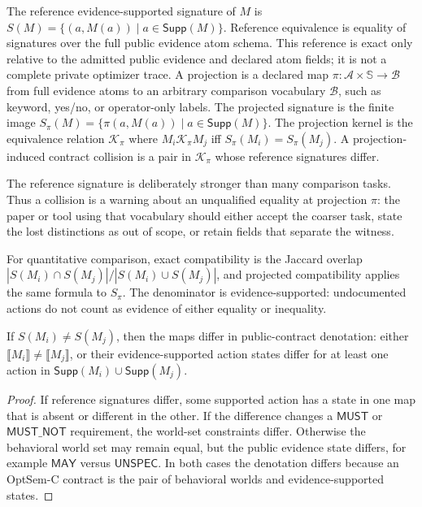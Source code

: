 \begin{definition}
The reference evidence-supported signature of $M$ is $S(M)=\{(a,M(a))\mid a\in\mathsf{Supp}(M)\}$.  Reference equivalence is equality of signatures over the full public evidence atom schema.  This reference is exact only relative to the admitted public evidence and declared atom fields; it is not a complete private optimizer trace.  A projection is a declared map $\pi:\mathcal{A}\times\mathbb{S}\rightarrow\mathcal{B}$ from full evidence atoms to an arbitrary comparison vocabulary $\mathcal{B}$, such as keyword, yes/no, or operator-only labels.  The projected signature is the finite image $S_\pi(M)=\{\pi(a,M(a))\mid a\in\mathsf{Supp}(M)\}$.  The projection kernel is the equivalence relation $\mathcal{K}_\pi$ where $M_i\mathcal{K}_\pi M_j$ iff $S_\pi(M_i)=S_\pi(M_j)$.  A projection-induced contract collision is a pair in $\mathcal{K}_\pi$ whose reference signatures differ.
\end{definition}

The reference signature is deliberately stronger than many comparison tasks.  Thus a collision is a warning about an unqualified equality at projection $\pi$: the paper or tool using that vocabulary should either accept the coarser task, state the lost distinctions as out of scope, or retain fields that separate the witness.

For quantitative comparison, exact compatibility is the Jaccard overlap $|S(M_i)\cap S(M_j)|/|S(M_i)\cup S(M_j)|$, and projected compatibility applies the same formula to $S_\pi$.  The denominator is evidence-supported: undocumented actions do not count as evidence of either equality or inequality.

\begin{lemma}
\label{thm:public-contract-separation}
If $S(M_i)\ne S(M_j)$, then the maps differ in public-contract denotation: either $\llbracket M_i\rrbracket\ne\llbracket M_j\rrbracket$, or their evidence-supported action states differ for at least one action in $\mathsf{Supp}(M_i)\cup\mathsf{Supp}(M_j)$.
\end{lemma}
\begin{proof}
If reference signatures differ, some supported action has a state in one map that is absent or different in the other.  If the difference changes a $\mathsf{MUST}$ or $\mathsf{MUST\_NOT}$ requirement, the world-set constraints differ.  Otherwise the behavioral world set may remain equal, but the public evidence state differs, for example $\mathsf{MAY}$ versus $\mathsf{UNSPEC}$.  In both cases the denotation differs because an OptSem-C contract is the pair of behavioral worlds and evidence-supported states.
\end{proof}

